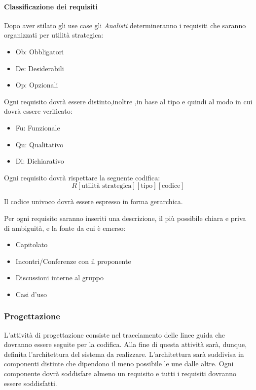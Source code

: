 \paragraph{Classificazione dei requisiti}

Dopo aver stilato gli use case gli  \emph{Analisti}  determineranno i
requisiti che saranno organizzati per utilità strategica:
\begin{itemize}
\item Ob: Obbligatori
\item De: Desiderabili
\item Op: Opzionali
\end{itemize}
Ogni requisito dovrà essere distinto,inoltre ,in base al tipo e quindi al modo in cui dovrà essere verificato:
\begin{itemize}
\item Fu: Funzionale
\item Qu: Qualitativo
\item Di: Dichiarativo
\end{itemize}
Ogni requisito dovrà rispettare la seguente codifica:
$$ R[\text{utilità strategica}][\text{tipo}][\text{codice}] $$

Il codice univoco dovrà essere espresso in forma gerarchica.

Per ogni requisito saranno inseriti una descrizione, il più possibile
chiara e priva di ambiguità, e la fonte da cui è emerso: 
\begin{itemize}
\item Capitolato
\item Incontri/Conferenze con il proponente
\item Discussioni interne al gruppo
\item Casi d'uso
\end{itemize}



\subsubsection{Progettazione}

L'attività di progettazione consiste nel tracciamento delle linee
guida che dovranno essere seguite per la codifica. Alla fine di questa
attività sarà, dunque, definita l'architettura del sistema da
realizzare. L'architettura sarà suddivisa in componenti distinte che
dipendono il meno possibile le une dalle altre. Ogni componente dovrà
soddisfare almeno un requisito e tutti i requisiti dovranno essere
soddisfatti. 

